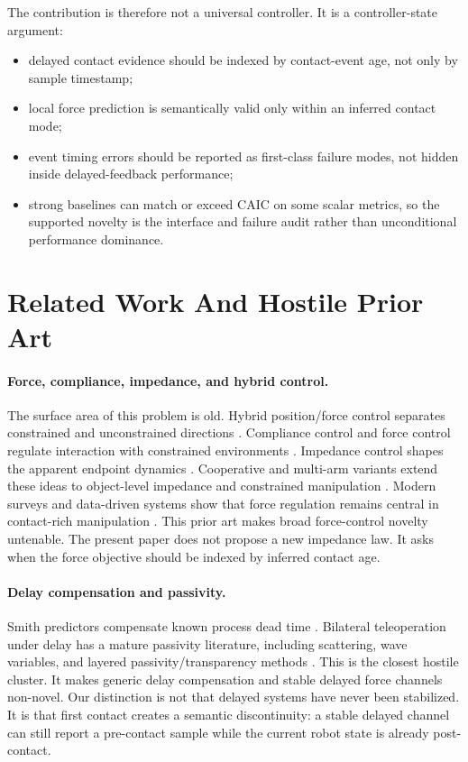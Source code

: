 \documentclass{article}
\newcommand{\caic}{CAIC}
\begin{document}
The contribution is therefore not a universal controller. It is a controller-state argument:
\begin{itemize}
    \item delayed contact evidence should be indexed by contact-event age, not only by sample timestamp;
    \item local force prediction is semantically valid only within an inferred contact mode;
    \item event timing errors should be reported as first-class failure modes, not hidden inside delayed-feedback performance;
    \item strong baselines can match or exceed \caic{} on some scalar metrics, so the supported novelty is the interface and failure audit rather than unconditional performance dominance.
\end{itemize}

\section{Related Work And Hostile Prior Art}

\paragraph{Force, compliance, impedance, and hybrid control.}
The surface area of this problem is old. Hybrid position/force control separates constrained and unconstrained directions \citep{raibert1981hybrid}. Compliance control and force control regulate interaction with constrained environments \citep{mason1981compliance}. Impedance control shapes the apparent endpoint dynamics \citep{hogan1985impedance}. Cooperative and multi-arm variants extend these ideas to object-level impedance and constrained manipulation \citep{schneider1992object,yoshikawa1993coordinated}. Modern surveys and data-driven systems show that force regulation remains central in contact-rich manipulation \citep{beltran2020learning,suomalainen2022survey}. This prior art makes broad force-control novelty untenable. The present paper does not propose a new impedance law. It asks when the force objective should be indexed by inferred contact age.

\paragraph{Delay compensation and passivity.}
Smith predictors compensate known process dead time \citep{smith1957closer}. Bilateral teleoperation under delay has a mature passivity literature, including scattering, wave variables, and layered passivity/transparency methods \citep{anderson1989bilateral,niemeyer1991stable,stramigioli2005sampled,franken2011bilateral}. This is the closest hostile cluster. It makes generic delay compensation and stable delayed force channels non-novel. Our distinction is not that delayed systems have never been stabilized. It is that first contact creates a semantic discontinuity: a stable delayed channel can still report a pre-contact sample while the current robot state is already post-contact.
\end{document}
